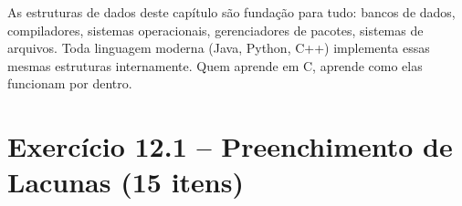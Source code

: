 \documentclass[12pt,a4paper]{article}
\begin{document}
\begin{boaprática}
  As estruturas de dados deste capítulo são fundação para tudo: bancos de dados,
  compiladores, sistemas operacionais, gerenciadores de pacotes, sistemas de
  arquivos. Toda linguagem moderna (Java, Python, C++) implementa essas mesmas
  estruturas internamente. Quem aprende em C, aprende como elas funcionam por
  dentro.
\end{boaprática}

\tableofcontents\newpage

\section{Exercício 12.1 -- Preenchimento de Lacunas (15 itens)}
\end{document}
